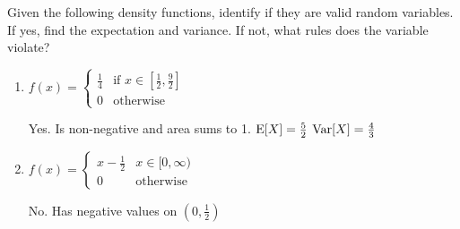 \question Given the following density functions, identify if they are 
valid random variables. If yes, find the expectation and variance. If 
not, what rules does the variable violate?
\begin{enumerate}[label=(\alph*)]
    \item
        $f(x) = \begin{cases} 
            \frac{1}{4} & \text{if } x \in [\frac{1}{2}, \frac{9}{2}] \\ 
            0 & \text{otherwise} 
        \end{cases}$
        \begin{solution}[1cm]
            Yes. Is non-negative and area sums to 1.
            $\text{E}[X] = \frac{5}{2}$
            $\text{Var}[X] = \frac{4}{3}$ 
        \end{solution}
    \item
        $f(x) = \begin{cases} 
            x - \frac{1}{2} & x \in [0, \infty) \\
            0 & \text{otherwise}
        \end{cases}$
        \begin{solution}[1cm]
            No. Has negative values on $(0, \frac{1}{2})$
        \end{solution}
\end{enumerate}
